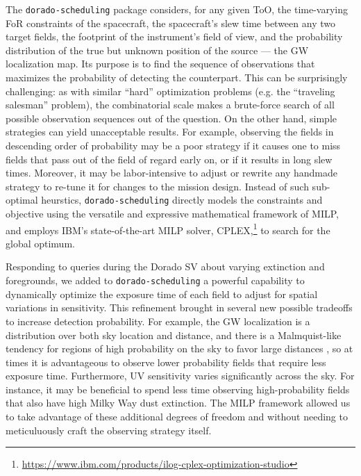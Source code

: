 \documentclass[twocolumn,times]{aastex631}
\begin{document}
The \texttt{dorado-scheduling} package considers, for any given \ac{ToO}, the time-varying \ac{FoR} constraints of the spacecraft, the spacecraft's slew time between any two target fields, the footprint of the instrument's field of view, and the probability distribution of the true but unknown position of the source --- the \ac{GW} localization map. Its purpose is to find the sequence of observations that maximizes the probability of detecting the counterpart. This can be surprisingly challenging: as with similar ``hard'' optimization problems (e.g. the ``traveling salesman'' problem), the combinatorial scale makes a brute-force search of all possible observation sequences out of the question. On the other hand, simple strategies can yield unacceptable results. For example, observing the fields in descending order of probability may be a poor strategy if it causes one to miss fields that pass out of the field of regard early on, or if it results in long slew times. Moreover, it may be labor-intensive to adjust or rewrite any handmade strategy to re-tune it for changes to the mission design. Instead of such sub-optimal heurstics, \texttt{dorado-scheduling} directly models the constraints and objective using the versatile and expressive mathematical framework of \ac{MILP}, and employs IBM's state-of-the-art \ac{MILP} solver, CPLEX,\footnote{\url{https://www.ibm.com/products/ilog-cplex-optimization-studio}} to search for the global optimum.

Responding to queries during the Dorado \ac{SV} about varying extinction and foregrounds, we added to \texttt{dorado-scheduling} a powerful capability to dynamically optimize the exposure time of each field to adjust for spatial variations in sensitivity. This refinement brought in several new possible tradeoffs to increase detection probability. For example, the \ac{GW} localization is a distribution over both sky location and distance, and there is a Malmquist-like tendency for regions of high probability on the sky to favor large distances \citep{2016ApJ...829L..15S}, so at times it is advantageous to observe lower probability fields that require less exposure time. Furthermore, \ac{UV} sensitivity varies significantly across the sky. For instance, it may be beneficial to spend less time observing high-probability fields that also have high Milky Way dust extinction. The \ac{MILP} framework allowed us to take advantage of these additional degrees of freedom and without needing to meticuluously craft the observing strategy itself.
\end{document}
